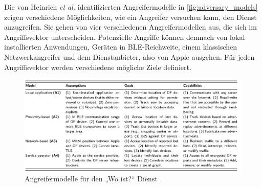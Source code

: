 Die von Heinrich \textit{et al.} \cite{Heinrich_FindMy} identifizierten Angreifermodelle in \autoref{fig:adversary_models} zeigen verschiedene Möglichkeiten, wie ein Angreifer versuchen kann, den Dienst anzugreifen.
Sie gehen von vier verschiedenen Angreifermodellen aus, die sich im Angriffsvektor unterscheiden.
Potenzielle Angriffe können demnach von lokal installierten Anwendungen, Geräten in \ac{BLE}-Reichweite, einem klassischen Netzwerkangreifer und dem Dienstanbieter, also von Apple ausgehen.
Für jeden Angriffsvektor werden verschiedene mögliche Ziele definiert.
\begin{figure}[ht]
  \centering
  \includegraphics[width=\textwidth]{img/adversary_models}
  \caption{Angreifermodelle für den „Wo ist?“ Dienst \cite{Heinrich_FindMy}.}
  \label{fig:adversary_models}
\end{figure}

